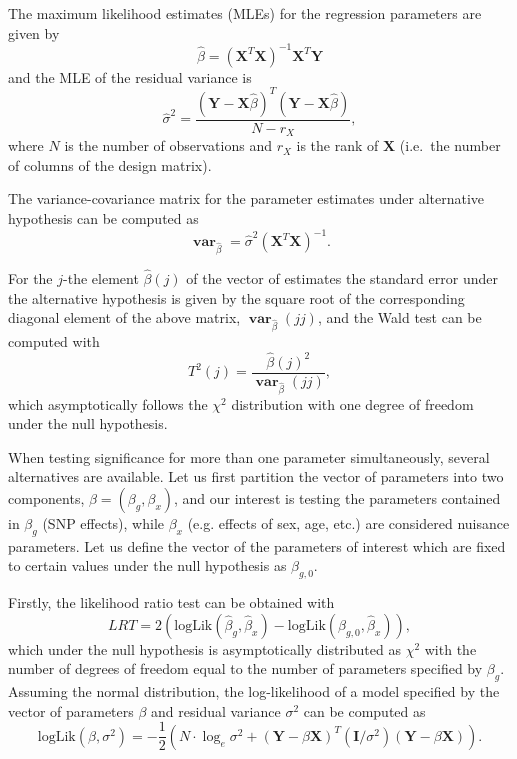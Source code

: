 \documentclass[12pt,a4paper]{article}
\DeclareMathOperator{\var}{\mathbf{var}}
\begin{document}
The maximum likelihood estimates (MLEs) for the regression parameters
are given by
\begin{equation}
  \hat{\beta} = (\mathbf{X}^T \mathbf{X})^{-1} \mathbf{X}^T \mathbf{Y}
\end{equation}
and the MLE of the residual variance is
\begin{equation}
  \hat{\sigma}^2 = \frac{(\mathbf{Y} - \mathbf{X}\hat{\beta})^T
    (\mathbf{Y} - \mathbf{X}\hat{\beta})} {N-r_X},
\end{equation}
where $N$ is the number of observations and $r_X$ is the rank of
$\mathbf{X}$ (i.e.~the number of columns of the design matrix).

The variance-covariance matrix for the parameter estimates under
alternative hypothesis can be computed as
\begin{equation}
\var_{\hat{\beta}} = \hat{\sigma}^2 (\mathbf{X}^T\mathbf{X})^{-1}.
\end{equation}

For the $j$-the element $\hat{\beta}(j)$ of the vector of estimates the standard
error under the alternative hypothesis is given by the square root of the
corresponding diagonal element of the above matrix, $\var_{\hat{\beta}}(jj)$,
and the Wald test can be computed with
$$
T^2(j) = \frac{ \hat{\beta}(j)^2 }{ \var_{\hat{\beta}}(jj) },
$$
which asymptotically follows the $\chi^2$ distribution with one degree of
freedom under the null hypothesis.

When testing significance for more than one parameter simultaneously,
several alternatives are available. Let us first partition the vector of
parameters into two components, $\beta = (\beta_g,\beta_x)$, and our
interest is testing the parameters contained in $\beta_g$ (SNP effects),
while $\beta_x$ (e.g. effects of sex, age, etc.) are considered nuisance
parameters. Let us define the vector of the parameters of interest
which are fixed to certain values under the null hypothesis as
$\beta_{g,0}$.

Firstly, the likelihood ratio test can be obtained with
$$
LRT = 2 \left(\mathrm{logLik}(\hat{\beta}_g,\hat{\beta}_x) -
\mathrm{logLik}(\beta_{g,0},\hat{\beta}_x) \right),
$$
which under the null hypothesis is asymptotically distributed as
$\chi^2$ with the
number of degrees of freedom equal to the number of parameters specified
by $\beta_g$. Assuming the normal distribution, the log-likelihood of a
model specified by the vector of parameters $\beta$ and residual variance
$\sigma^2$ can be computed as
$$
\mathrm{logLik}(\beta,\sigma^2) =
-\frac{1}{2} \left( N \cdot \log_e \sigma^2 +
(\mathbf{Y} - \beta \mathbf{X})^T (\mathbf{I}/\sigma^2) (\mathbf{Y} -
\beta \mathbf{X}) \right).
$$
\end{document}
